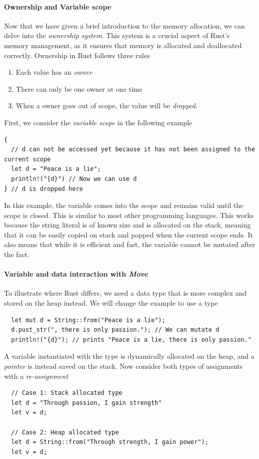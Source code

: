 \documentclass[11pt]{report}
\theoremstyle{definition}
\theoremstyle{plain}
\begin{document}
\paragraph{Ownership and Variable scope}
Now that we have given a brief introduction to the memory allocation, we can delve into the \textit{ownership system}. This system is a crucial aspect of Rust's memory management, as it ensures that memory is allocated and deallocated correctly. Ownership in Rust follows three rules
\begin{enumerate}[parsep=0pt, itemsep=0pt]
  \item Each value has an \textit{owner}
  \item There can only be one owner at one time
  \item When a owner goes out of scope, the value will be \textit{dropped}.
\end{enumerate}
First, we consider the \textit{variable scope} in the following example
\begin{verbatim}
{
  // d can not be accessed yet because it has not been assigned to the current scope
  let d = "Peace is a lie";
  println!("{d}") // Now we can use d
} // d is dropped here
\end{verbatim}
In this example, the variable  comes into the scope and remains valid until the scope is closed. This is similar to most other programming languages. This works because the string literal  is of known size and is allocated on the stack, meaning that it can be easily copied on stack and popped when the current scope ends. It also means that while it is efficient and fast, the variable  cannot be mutated after the fact.

\paragraph{Variable and data interaction with \textit{Move}}

To illustrate where Rust differs, we need a data type that is more complex and stored on the heap instead. We will change the example to use a  type
\begin{verbatim}
  let mut d = String::from("Peace is a lie");
  d.pust_str(", there is only passion."); // We can mutate d
  println!("{d}"); // prints "Peace is a lie, there is only passion."
\end{verbatim}
A variable instantiated with the  type is dynamically allocated on the heap, and a \textit{pointer} is instead saved on the stack. Now consider both types of assignments with a \textit{re-assignment}
\begin{verbatim}
  // Case 1: Stack allocated type
  let d = "Through passion, I gain strength"
  let v = d;

  // Case 2: Heap allocated type
  let d = String::from("Through strength, I gain power");
  let v = d;
\end{verbatim}
\end{document}
